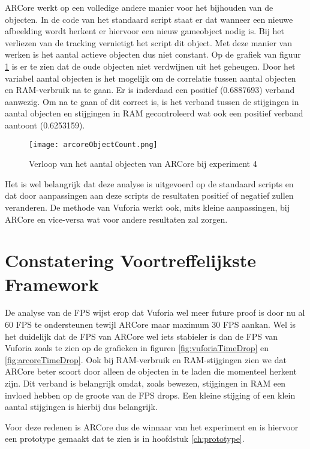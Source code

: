 ARCore werkt op een volledige andere manier voor het bijhouden van de objecten. In de code van het standaard script staat er dat wanneer een nieuwe afbeelding wordt herkent er hiervoor een nieuw gameobject nodig is. Bij het verliezen van de tracking vernietigt het script dit object. Met deze manier van werken is het aantal actieve objecten dus niet constant. Op de grafiek van figuur \ref{fig:arcoreObjectCount} is er te zien dat de oude objecten niet verdwijnen uit het geheugen. Door het variabel aantal objecten is het mogelijk om de correlatie tussen aantal objecten en RAM-verbruik na te gaan. Er is inderdaad een positief (0.6887693) verband aanwezig. Om na te gaan of dit correct is, is het verband tussen de stijgingen in aantal objecten en stijgingen in RAM gecontroleerd wat ook een positief verband aantoont (0.6253159). 

\begin{figure}
    \texttt{[image: arcoreObjectCount.png]}
    \caption{Verloop van het aantal objecten van ARCore bij experiment 4}
    \label{fig:arcoreObjectCount}
\end{figure}

Het is wel belangrijk dat deze analyse is uitgevoerd op de standaard scripts en dat door aanpassingen aan deze scripts de resultaten positief of negatief zullen veranderen. De methode van Vuforia werkt ook, mits kleine aanpassingen, bij ARCore en vice-versa wat voor andere resultaten zal zorgen.

\section{Constatering Voortreffelijkste Framework}
De analyse van de FPS wijst erop dat Vuforia wel meer future proof is door nu al 60 FPS te ondersteunen tewijl ARCore maar maximum 30 FPS aankan. 
Wel is het duidelijk dat de FPS van ARCore wel iets stabieler is dan de FPS van Vuforia zoals te zien op de grafieken in figuren \ref{fig:vuforiaTimeDrop} en \ref{fig:arcoreTimeDrop}. 
Ook bij RAM-verbruik en RAM-stijgingen zien we dat ARCore beter scoort door alleen de objecten in te laden die momenteel herkent zijn. 
Dit verband is belangrijk omdat, zoals bewezen, stijgingen in RAM een invloed hebben op de groote van de FPS drops.
Een kleine stijging of een klein aantal stijgingen is hierbij dus belangrijk.

Voor deze redenen is ARCore dus de winnaar van het experiment en is hiervoor een prototype gemaakt dat te zien is in hoofdstuk \ref{ch:prototype}.
